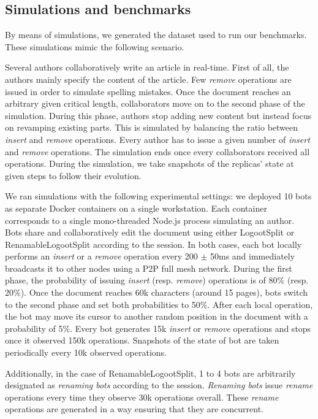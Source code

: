 \documentclass[10pt,journal,compsoc]{IEEEtran}
\begin{document}
\subsection{Simulations and benchmarks}

By means of simulations, we generated the dataset used to run our benchmarks.
These simulations mimic the following scenario.

Several authors collaboratively write an article in real-time.
First of all, the authors mainly specify the content of the article.
Few \emph{remove} operations are issued in order to simulate spelling mistakes.
Once the document reaches an arbitrary given critical length, collaborators move on to the second phase of the simulation.
During this phase, authors stop adding new content but instead focus on revamping existing parts.
This is simulated by balancing the ratio between \emph{insert} and \emph{remove} operations.
Every author has to issue a given number of \emph{insert} and \emph{remove} operations.
The simulation ends once every collaborators received all operations.
During the simulation, we take snapshots of the replicas' state at given steps to follow their evolution.

We ran simulations with the following experimental settings: we deployed 10 bots as separate Docker containers on a single workstation.
Each container corresponds to a single mono-threaded Node.js process simulating an author.
Bots share and collaboratively edit the document using either LogootSplit or RenamableLogootSplit according to the session.
In both cases, each bot locally performs an \emph{insert} or a \emph{remove} operation every 200 $\pm$ 50ms and immediately broadcasts it to other nodes using a \ac{P2P} full mesh network.
During the first phase, the probability of issuing \emph{insert} (resp. \emph{remove}) operations is of 80\% (resp. 20\%).
Once the document reaches 60k characters (around 15 pages), bots switch to the second phase and set both probabilities to 50\%.
After each local operation, the bot may move its cursor to another random position in the document with a probability of 5\%.
Every bot generates 15k \emph{insert} or \emph{remove} operations and stops once it observed 150k operations.
Snapshots of the state of bot are taken periodically every 10k observed operations.

Additionally, in the case of RenamableLogootSplit, 1 to 4 bots are arbitrarily designated as \emph{renaming bots} according to the session.
\emph{Renaming bots} issue \emph{rename} operations every time they observe 30k operations overall.
These \emph{rename} operations are generated in a way ensuring that they are concurrent.
\end{document}
